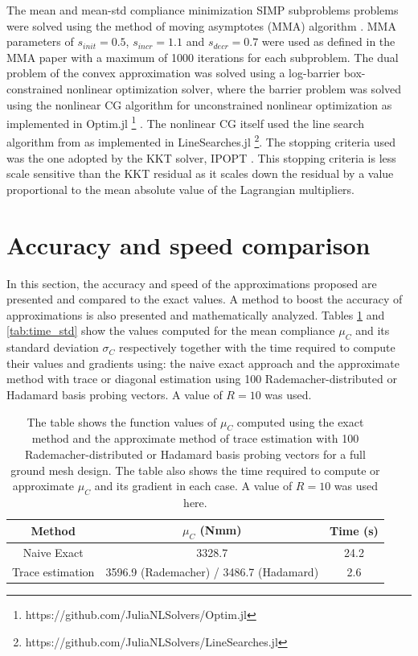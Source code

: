     The mean and mean-std compliance minimization SIMP subproblems problems were solved using the method of moving asymptotes (MMA) algorithm \citep{Svanberg1987}. MMA parameters of $s_{init} = 0.5$, $s_{incr} = 1.1$ and $s_{decr} = 0.7$ were used as defined in the MMA paper with a maximum of 1000 iterations for each subproblem. The dual problem of the convex approximation was solved using a log-barrier box-constrained nonlinear optimization solver, where the barrier problem was solved using the nonlinear CG algorithm for unconstrained nonlinear optimization \citep{Nocedal2006} as implemented in Optim.jl \footnote{https://github.com/JuliaNLSolvers/Optim.jl} \citep{KMogensen2018}. The nonlinear CG itself used the line search algorithm from \cite{Hager2006} as implemented in LineSearches.jl \footnote{https://github.com/JuliaNLSolvers/LineSearches.jl}. The stopping criteria used was the one adopted by the KKT solver, IPOPT \citep{Wachter2006}. This stopping criteria is less scale sensitive than the KKT residual as it scales down the residual by a value proportional to the mean absolute value of the Lagrangian multipliers.

\section{Accuracy and speed comparison}

In this section, the accuracy and speed of the approximations proposed are presented and compared to the exact values. A method to boost the accuracy of approximations is also presented and mathematically analyzed. Tables \ref{tab:time_mean} and \ref{tab:time_std} show the values computed for the mean compliance $\mu_C$ and its standard deviation $\sigma_C$ respectively together with the time required to compute their values and gradients using: the naive exact approach and the approximate method with trace or diagonal estimation using 100 Rademacher-distributed or Hadamard basis probing vectors. A value of $R = 10$ was used.
\begin{table}
 \centering
 \caption{The table shows the function values of $\mu_C$ computed using the exact method and the approximate method of trace estimation with 100 Rademacher-distributed or Hadamard basis probing vectors for a full ground mesh design. The table also shows the time required to compute or approximate $\mu_C$ and its gradient in each case. A value of $R = 10$ was used here.}
 \begin{tabular}{|c|c|c|}
  \hline
  Method & $\mu_C$ (Nmm) & Time (s) \\
  \hline
  \hline
  Naive Exact & 3328.7 & 24.2 \\
  \hline
  Trace estimation & 3596.9 (Rademacher) / 3486.7 (Hadamard) & 2.6 \\
  \hline
 \end{tabular}
 \label{tab:time_mean}
\end{table}

